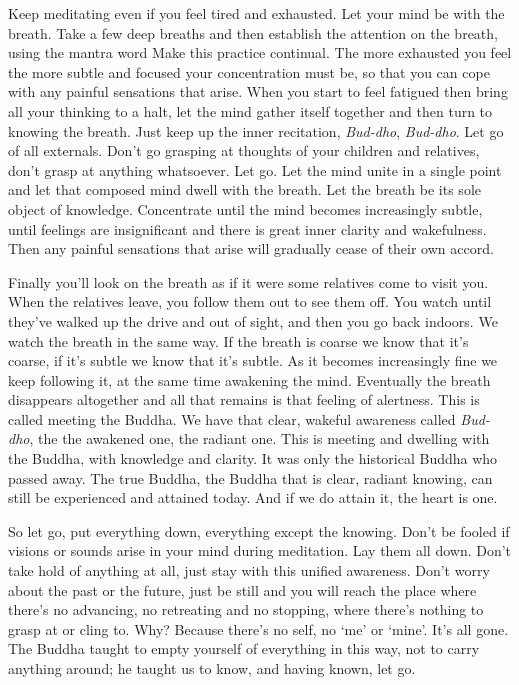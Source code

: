 Keep meditating even if you feel tired and exhausted. Let your mind be with the breath. Take a few deep breaths and then establish the attention on the breath, using the mantra word  Make this practice continual. The more exhausted you feel the more subtle and focused your concentration must be, so that you can cope with any painful sensations that arise. When you start to feel fatigued then bring all your thinking to a halt, let the mind gather itself together and then turn to knowing the breath. Just keep up the inner recitation, \textit{Bud-dho}, \textit{Bud-dho}. Let go of all externals. Don't go grasping at thoughts of your children and relatives, don't grasp at anything whatsoever. Let go. Let the mind unite in a single point and let that composed mind dwell with the breath. Let the breath be its sole object of knowledge. Concentrate until the mind becomes increasingly subtle, until feelings are insignificant and there is great inner clarity and wakefulness. Then any painful sensations that arise will gradually cease of their own accord. 

Finally you'll look on the breath as if it were some relatives come to visit you. When the relatives leave, you follow them out to see them off. You watch until they've walked up the drive and out of sight, and then you go back indoors. We watch the breath in the same way. If the breath is coarse we know that it's coarse, if it's subtle we know that it's subtle. As it becomes increasingly fine we keep following it, at the same time awakening the mind. Eventually the breath disappears altogether and all that remains is that feeling of alertness. This is called meeting the Buddha. We have that clear, wakeful awareness called \textit{Bud-dho}, the  the awakened one, the radiant one. This is meeting and dwelling with the Buddha, with knowledge and clarity. It was only the historical Buddha who passed away. The true Buddha, the Buddha that is clear, radiant knowing, can still be experienced and attained today. And if we do attain it, the heart is one. 

So let go, put everything down, everything except the knowing. Don't be fooled if visions or sounds arise in your mind during meditation. Lay them all down. Don't take hold of anything at all, just stay with this unified awareness. Don't worry about the past or the future, just be still and you will reach the place where there's no advancing, no retreating and no stopping, where there's nothing to grasp at or cling to. Why? Because there's no self, no `me' or `mine'. It's all gone. The Buddha taught to empty yourself of everything in this way, not to carry anything around; he taught us to know, and having known, let go. 

